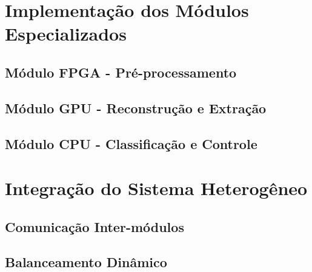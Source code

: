 
\section{Implementação dos Módulos Especializados}


\subsection{Módulo FPGA - Pré-processamento}


\subsection{Módulo GPU - Reconstrução e Extração}


\subsection{Módulo CPU - Classificação e Controle}


\section{Integração do Sistema Heterogêneo}


\subsection{Comunicação Inter-módulos}


\subsection{Balanceamento Dinâmico}

